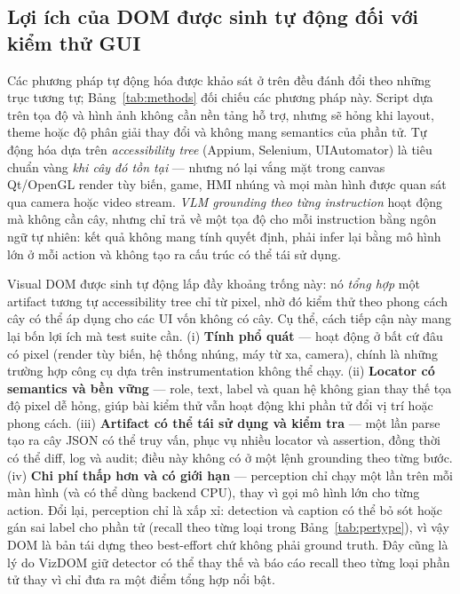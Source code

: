 \documentclass[11pt,a4paper]{article}
\begin{document}
\subsection{Lợi ích của DOM được sinh tự động đối với kiểm thử GUI}
\label{sec:dombenefits}
Các phương pháp tự động hóa được khảo sát ở trên đều đánh đổi theo những trục tương
tự; Bảng~\ref{tab:methods} đối chiếu các phương pháp này. Script dựa trên tọa độ và
hình ảnh không cần nền tảng hỗ trợ, nhưng sẽ hỏng khi layout, theme hoặc độ phân giải
thay đổi và không mang semantics của phần tử. Tự động hóa dựa trên
\emph{accessibility tree} (Appium, Selenium, UIAutomator) là tiêu chuẩn vàng
\emph{khi cây đó tồn tại} --- nhưng nó lại vắng mặt trong canvas Qt/OpenGL render
tùy biến, game, HMI nhúng và mọi màn hình được quan sát qua camera hoặc video
stream. \emph{VLM grounding theo từng instruction} hoạt động mà không cần cây,
nhưng chỉ trả về một tọa độ cho mỗi instruction bằng ngôn ngữ tự nhiên: kết quả
không mang tính quyết định, phải infer lại bằng mô hình lớn ở mỗi action và không
tạo ra cấu trúc có thể tái sử dụng.

Visual DOM được sinh tự động lấp đầy khoảng trống này: nó \emph{tổng hợp} một
artifact tương tự accessibility tree chỉ từ pixel, nhờ đó kiểm thử theo phong cách
cây có thể áp dụng cho các UI vốn không có cây. Cụ thể, cách tiếp cận này mang lại
bốn lợi ích mà test suite cần. (i) \textbf{Tính phổ quát} --- hoạt động ở bất cứ đâu
có pixel (render tùy biến, hệ thống nhúng, máy từ xa, camera), chính là những trường
hợp công cụ dựa trên instrumentation không thể chạy. (ii) \textbf{Locator có
semantics và bền vững} --- role, text, label và quan hệ không gian thay thế tọa độ
pixel dễ hỏng, giúp bài kiểm thử vẫn hoạt động khi phần tử đổi vị trí hoặc phong
cách. (iii) \textbf{Artifact có thể tái sử dụng và kiểm tra} --- một lần parse tạo ra
cây JSON có thể truy vấn, phục vụ nhiều locator và assertion, đồng thời có thể diff,
log và audit; điều này không có ở một lệnh grounding theo từng bước. (iv)
\textbf{Chi phí thấp hơn và có giới hạn} --- perception chỉ chạy một lần trên mỗi
màn hình (và có thể dùng backend CPU), thay vì gọi mô hình lớn cho từng action. Đổi
lại, perception chỉ là xấp xỉ: detection và caption có thể bỏ sót hoặc gán sai label
cho phần tử (recall theo từng loại trong Bảng~\ref{tab:pertype}), vì vậy DOM là bản
tái dựng theo best-effort chứ không phải ground truth. Đây cũng là lý do VizDOM giữ
detector có thể thay thế và báo cáo recall theo từng loại phần tử thay vì chỉ đưa ra
một điểm tổng hợp nổi bật.
\end{document}
